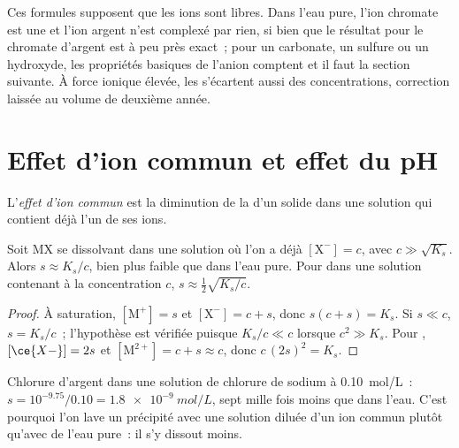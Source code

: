 \begin{remark}
Ces formules supposent que les ions sont libres. Dans l'eau pure, l'ion
chromate est une  et l'ion argent n'est complexé par rien, si
bien que le résultat pour le chromate d'argent est à peu près exact~;
pour un carbonate, un sulfure ou un hydroxyde, les propriétés basiques
de l'anion comptent et il faut la section suivante. À force ionique
élevée, les  s'écartent aussi des concentrations, correction
laissée au volume de deuxième année.
\end{remark}

\section{Effet d'ion commun et effet du pH}

\begin{definition}\label{def:b1:precipitation:common-ion}
L'\emph{effet d'ion commun} est la diminution
de la  d'un solide dans une solution qui contient déjà l'un de
ses ions.
\end{definition}

\begin{proposition}\label{prop:b1:precipitation:common-ion}
Soit MX se dissolvant dans une solution où l'on a déjà
$[\mathrm{X}^-] = c$, avec
$c \gg \sqrt{K_s}$. Alors $s \approx K_s/c$, bien plus faible que dans
l'eau pure. Pour  dans une solution contenant  à la
concentration $c$,
$s \approx \frac12\sqrt{K_s/c}$.
\end{proposition}

\begin{proof}
À saturation, $[\mathrm{M}^+] = s$ et $[\mathrm{X}^-] = c + s$, donc
$s(c + s) = K_s$. Si $s \ll c$, $s = K_s/c$~; l'hypothèse est vérifiée
puisque $K_s/c \ll c$ lorsque $c^2 \gg K_s$. Pour ,
$[\ce{X-}] = 2s$ et
$[\mathrm{M}^{2+}] = c + s \approx c$, donc $c\,(2s)^2 = K_s$.
\end{proof}

Chlorure d'argent dans une solution de chlorure de sodium à
\qty{0.10}{mol/L}~: $s = 10^{-9.75}/0.10
= \qty{1.8e-9}{mol/L}$, sept mille fois moins que dans l'eau. C'est
pourquoi l'on lave un précipité avec une solution diluée d'un ion
commun plutôt qu'avec de l'eau pure~: il s'y dissout moins.

